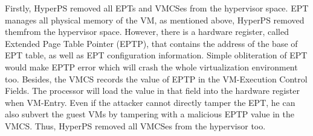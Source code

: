 Firstly, HyperPS removed all EPTs and VMCSes from the hypervisor space. EPT manages all physical memory of the VM, as mentioned above, HyperPS removed themfrom the hypervisor space. However, there is a hardware register, called Extended Page Table Pointer (EPTP), that contains the address of the base of EPT table, as well as EPT configuration information. Simple obliteration of EPT would make EPTP error which will crash the whole virtualization environment too. 
Besides, the VMCS records the value of EPTP in the VM-Execution Control Fields. The processor will load the value in that field into the hardware register when VM-Entry. 
Even if the attacker cannot directly tamper the EPT, he can also subvert the guest VMs by tampering with a malicious EPTP value in the VMCS. Thus, HyperPS removed all VMCSes from the hypervisor too. 

